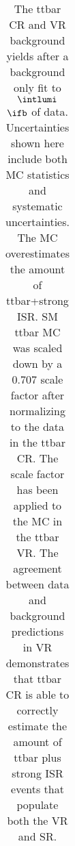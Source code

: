 \begin{table}
\begin{center}
{\begin{tabular*}{\textwidth}{@{\extracolsep{\fill}}lrr}
\end{tabular*}
}
\end{center}
\caption{The ttbar CR and VR background yields after a background only fit to $\intlumi$ $\ifb$ of data. Uncertainties shown here include both MC statistics and systematic uncertainties.  The MC overestimates the amount of ttbar+strong ISR.  SM ttbar MC was scaled down by a 0.707 scale factor after normalizing to the data in the ttbar CR.  The scale factor has been applied to the MC in the ttbar VR.  The agreement between data and background predictions in VR demonstrates that ttbar CR is able to correctly estimate the amount of ttbar plus strong ISR events that populate both the VR and SR.  }
\label{table.bkgonly.CRVRTopC}
\end{table}
%